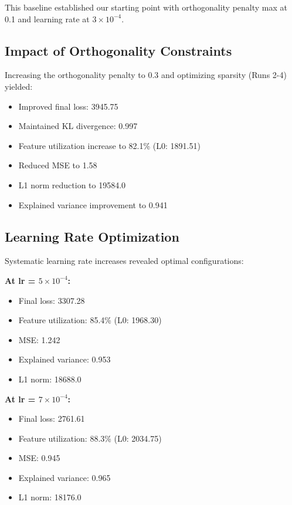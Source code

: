\documentclass{article} %
\begin{document}
This baseline established our starting point with orthogonality penalty max at 0.1 and learning rate at $3 \times 10^{-4}$.

\subsection{Impact of Orthogonality Constraints}
Increasing the orthogonality penalty to 0.3 and optimizing sparsity (Runs 2-4) yielded:
\begin{itemize}
    \item Improved final loss: 3945.75
    \item Maintained KL divergence: 0.997
    \item Feature utilization increase to 82.1\% (L0: 1891.51)
    \item Reduced MSE to 1.58
    \item L1 norm reduction to 19584.0
    \item Explained variance improvement to 0.941
\end{itemize}

\subsection{Learning Rate Optimization}
Systematic learning rate increases revealed optimal configurations:

\textbf{At lr = $5 \times 10^{-4}$:}
\begin{itemize}
    \item Final loss: 3307.28
    \item Feature utilization: 85.4\% (L0: 1968.30)
    \item MSE: 1.242
    \item Explained variance: 0.953
    \item L1 norm: 18688.0
\end{itemize}

\textbf{At lr = $7 \times 10^{-4}$:}
\begin{itemize}
    \item Final loss: 2761.61
    \item Feature utilization: 88.3\% (L0: 2034.75)
    \item MSE: 0.945
    \item Explained variance: 0.965
    \item L1 norm: 18176.0
\end{itemize}
\end{document}

